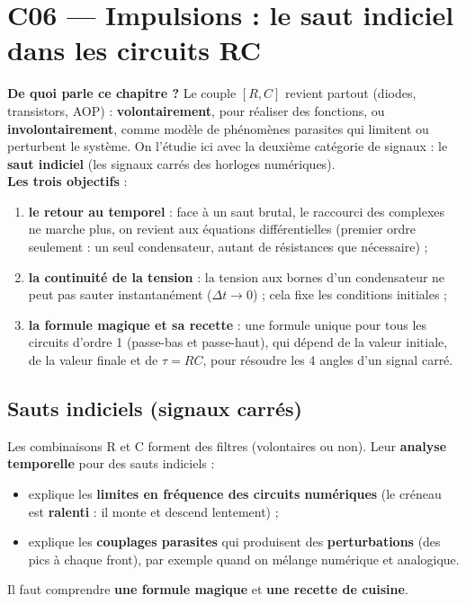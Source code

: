 \chapter{C06 --- Impulsions : le saut indiciel dans les circuits RC}

\begin{rembox}[title=En bref]
\textbf{De quoi parle ce chapitre ?} Le couple $[R, C]$ revient partout (diodes,
transistors, AOP) : \textbf{volontairement}, pour réaliser des fonctions, ou
\textbf{involontairement}, comme modèle de phénomènes parasites qui limitent ou perturbent
le système. On l'étudie ici avec la deuxième catégorie de signaux : le \textbf{saut
indiciel} (les signaux carrés des horloges numériques). \\
\textbf{Les trois objectifs} :
\begin{enumerate}
  \item \textbf{le retour au temporel} : face à un saut brutal, le raccourci des complexes
        ne marche plus, on revient aux équations différentielles (premier ordre seulement :
        un seul condensateur, autant de résistances que nécessaire) ;
  \item \textbf{la continuité de la tension} : la tension aux bornes d'un condensateur ne
        peut pas sauter instantanément ($\Delta t\to0$) ; cela fixe les conditions
        initiales ;
  \item \textbf{la formule magique et sa recette} : une formule unique pour tous les circuits
        d'ordre 1 (passe-bas et passe-haut), qui dépend de la valeur initiale, de la valeur
        finale et de $\tau = RC$, pour résoudre les 4 \og angles\fg{} d'un signal carré.
\end{enumerate}
\end{rembox}

\section{Sauts indiciels (signaux carrés)}


Les combinaisons R et C forment des filtres (volontaires ou non). Leur \textbf{analyse
temporelle} pour des sauts indiciels :
\begin{itemize}
  \item explique les \textbf{limites en fréquence des circuits numériques} (le créneau est
        \textbf{ralenti} : il monte et descend lentement) ;
  \item explique les \textbf{couplages parasites} qui produisent des \textbf{perturbations}
        (des pics à chaque front), par exemple quand on mélange numérique et analogique.
\end{itemize}
Il faut comprendre \textbf{une formule magique} et \textbf{une recette de cuisine}.

